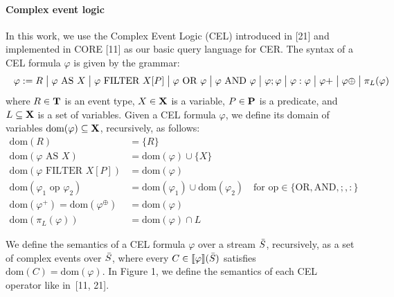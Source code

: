 \paragraph{Complex event logic} In this work, we use the Complex Event Logic (CEL) introduced in [21] and implemented in CORE [11] as our basic query language for CER. The syntax of a CEL formula $\varphi$ is given by the grammar:
\[
\makebox[\textwidth][s]{$
	\varphi := R \; \big|\; \varphi \text{ AS } X 
	\; \big|\; \varphi \text{ FILTER } X[P]
	\; \big|\; \varphi \text{ OR } \varphi
	\; \big|\; \varphi \text{ AND } \varphi
	\; \big|\; \varphi ; \varphi
	\; \big|\; \varphi : \varphi
	\; \big|\; \varphi{+}
	\; \big|\; \varphi{\oplus}
	\; \big|\; \pi_L(\varphi)
	$}
\]
where $R \in \mathbf{T}$ is an event type, $X \in \mathbf{X}$ is a variable, $P \in \mathbf{P}$ is a predicate, and $L \subseteq \mathbf{X}$ is a set of variables. Given a CEL formula $\varphi$, we define its domain of variables $\text{dom}(\varphi) \subseteq \mathbf{X}$, recursively, as follows:
\[
\begin{aligned}
	\text{dom}(R) &= \{R\} \\
	\text{dom}(\varphi \text{ AS } X) &= \text{dom}(\varphi) \cup \{X\} \\
	\text{dom}(\varphi \text{ FILTER } X[P]) &= \text{dom}(\varphi) \\
	\text{dom}(\varphi_1 \text{ op } \varphi_2) &= \text{dom}(\varphi_1) \cup \text{dom}(\varphi_2) \quad \text{for } \text{op} \in \{\text{OR}, \text{AND}, ;, :\} \\
	\text{dom}(\varphi^+) = \text{dom}(\varphi^\oplus) &= \text{dom}(\varphi) \\
	\text{dom}(\pi_L(\varphi)) &= \text{dom}(\varphi) \cap L
\end{aligned}
\]

We define the semantics of a CEL formula $\varphi$ over a stream $\bar{S}$, recursively, as a set of complex events over $\bar{S}$, where every $C \in \text{\textlbrackdbl} \varphi \text{\textrbrackdbl}(\Stream)$ satisfies $\text{dom}(C) = \text{dom}(\varphi)$. In Figure 1, we define the semantics of each CEL operator like in~[11, 21].


